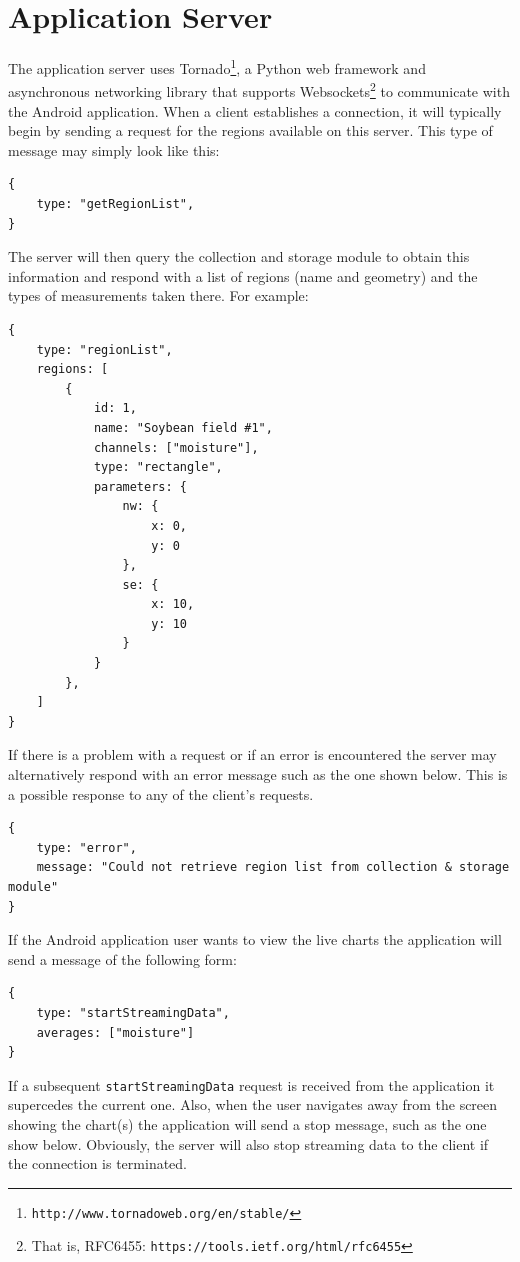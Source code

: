 \documentclass{article}
\begin{document}
\section{Application Server}
The application server uses Tornado\footnote{\texttt{http://www.tornadoweb.org/en/stable/}},
a Python web framework and asynchronous networking library that supports
Websockets\footnote{That is, RFC6455: \texttt{https://tools.ietf.org/html/rfc6455}}
to communicate with the Android application. 
When a client establishes a connection, it will typically begin by sending a request
for the regions available on this server. This type of message may simply look like this:
\begin{verbatim}
{
    type: "getRegionList",
}
\end{verbatim}

The server will then query the collection and storage module to obtain this information
and respond with a list of regions (name and geometry) and the types of measurements taken there.
For example:
\begin{verbatim}
{
    type: "regionList",
    regions: [
        {
            id: 1,
            name: "Soybean field #1",
            channels: ["moisture"],
            type: "rectangle",
            parameters: {
                nw: {
                    x: 0,
                    y: 0
                },
                se: {
                    x: 10,
                    y: 10
                }
            }
        },
    ]
}
\end{verbatim}

If there is a problem with a request or if an error is encountered the server may alternatively respond
with an error message such as the one shown below. This is a possible response to any of the client's requests.
\begin{verbatim}
{
    type: "error",
    message: "Could not retrieve region list from collection & storage module"
}
\end{verbatim}

If the Android application user wants to view the live charts the application will send a message of the following form:
\begin{verbatim}
{
    type: "startStreamingData",
    averages: ["moisture"]
}
\end{verbatim}

If a subsequent \texttt{startStreamingData} request is received from the application it supercedes the current one.
Also, when the user navigates away from the screen showing the chart(s) the application will send a stop message,
such as the one show below. Obviously, the server will also stop streaming data to the client if the connection is terminated.
\end{document}

